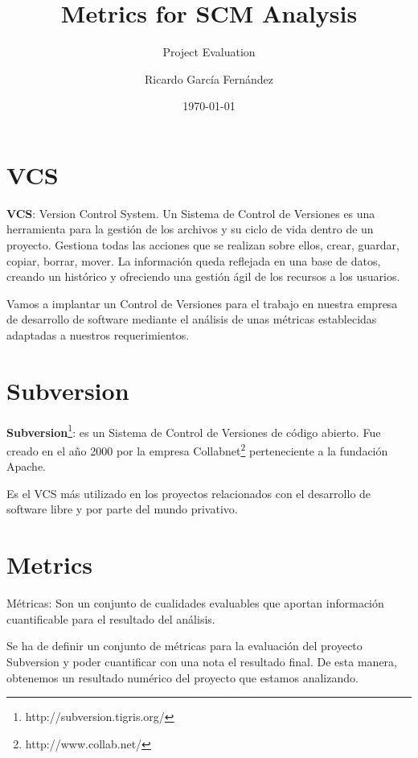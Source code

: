 \documentclass[11pt]{scrartcl}
\title{\textbf{Metrics for SCM Analysis}}
\subtitle{Project Evaluation}
\author{Ricardo Garc\'ia Fern\'andez}
\date{\today}
\begin{document}
\maketitle

\tableofcontents

\newpage

\section{VCS}

\par \textbf{VCS}: Version Control System. Un Sistema de Control de Versiones es una herramienta para la gesti\'on de los archivos y su ciclo de vida dentro de un proyecto. Gestiona todas las acciones que se realizan sobre ellos, crear, guardar, copiar, borrar, mover. La informaci\'on queda reflejada en una base de datos, creando un hist\'orico y ofreciendo una gesti\'on \'agil de los recursos a los usuarios.

\par Vamos a implantar un Control de Versiones para el trabajo en nuestra empresa de desarrollo de software mediante el an\'alisis de unas m\'etricas establecidas adaptadas a nuestros requerimientos.

\section{Subversion}

\textbf{Subversion}\footnote{http://subversion.tigris.org/}: es un Sistema de Control de Versiones de c\'odigo abierto. Fue creado en el a\~no 2000 por la empresa Collabnet\footnote{http://www.collab.net/} perteneciente a la fundaci\'on Apache.

\par Es el VCS m\'as utilizado en los proyectos relacionados con el desarrollo de software libre y por parte del mundo privativo.

\section{Metrics}

M\'etricas: Son un conjunto de cualidades evaluables que aportan informaci\'on cuantificable para el resultado del an\'alisis.

\par Se ha de definir un conjunto de m\'etricas para la evaluaci\'on del proyecto Subversion y poder cuantificar con una nota el resultado final. De esta manera, obtenemos un resultado num\'erico del proyecto que estamos analizando.
\end{document}
